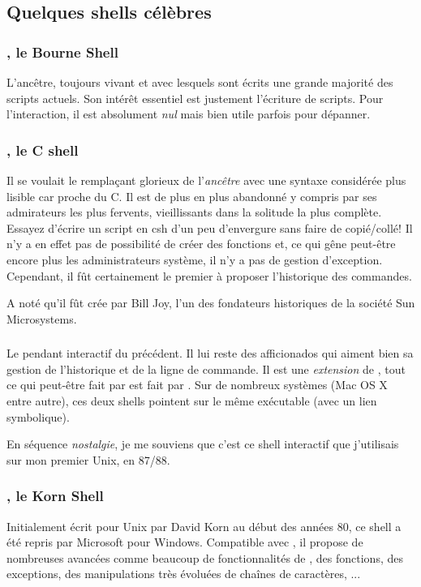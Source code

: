 \subsection{Quelques shells célèbres}
\subsubsection{\sh, le Bourne Shell}
L'ancêtre, toujours vivant et avec lesquels sont écrits une grande majorité des scripts actuels. Son intérêt essentiel est justement l'écriture de scripts. Pour l'interaction, il est absolument \emph{nul} mais bien utile parfois pour dépanner.

\subsubsection{\csh, le C shell}
Il se voulait le remplaçant glorieux de l'\emph{ancêtre} \sh avec une syntaxe considérée plus lisible car proche du C. Il est de plus en plus abandonné y compris par ses admirateurs les plus fervents, vieillissants dans la solitude la plus complète. Essayez d'écrire un script en csh d'un peu d'envergure sans faire de copié/collé! Il n'y a en effet pas de possibilité de créer des fonctions et, ce qui gêne peut-être encore plus les administrateurs système, il n'y a pas de gestion d'exception.  Cependant, il fût certainement le premier à proposer l'historique des commandes.

A noté qu'il fût crée par Bill Joy, l'un des fondateurs historiques de la société Sun Microsystems.

\subsubsection{\tcsh}
Le pendant interactif du précédent. Il lui reste des afficionados qui aiment bien sa gestion de l'historique et de la ligne de commande.  Il est une \emph{extension} de \csh, \ie tout ce qui peut-être fait par \csh est fait par \tcsh. Sur de nombreux systèmes (Mac OS X  entre autre), ces deux shells pointent sur le même exécutable (avec un lien symbolique).

En séquence \emph{nostalgie}, je me souviens que c'est ce shell interactif que j'utilisais sur mon premier Unix, en 87/88.

\subsubsection{\ksh, le Korn Shell}
Initialement écrit pour Unix par David Korn au début des années 80, ce shell a été repris par Microsoft pour Windows. Compatible avec \sh, il propose de nombreuses avancées comme beaucoup de fonctionnalités de \tcsh,  des fonctions, des exceptions, des manipulations très évoluées de chaînes de caractères, ...

